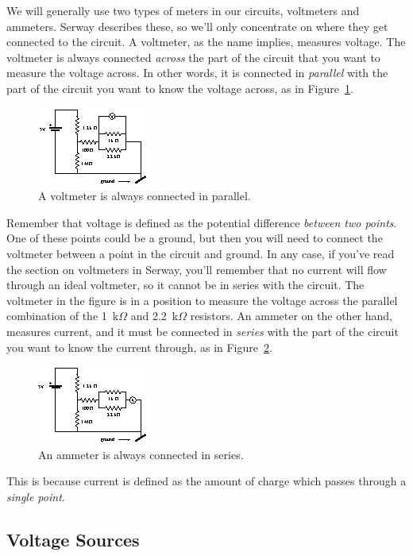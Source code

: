 \pagebreak
We will generally use two types of meters in our circuits, voltmeters and 
ammeters. Serway describes these, so we'll only concentrate on where they get 
connected to the circuit.  A voltmeter, as the name implies, measures voltage. 
The voltmeter is always connected {\it across} the part of the circuit that 
you want to measure the voltage across. In other words, it is connected in 
{\it parallel} with the part of the circuit you want to know the voltage 
across, as in Figure~\ref{fig:DC:voltmeter}.  
\begin{figure}[!htb]
\centering \epsfxsize=10cm \includegraphics[scale=6]{2_dc/voltmeter.eps}
\caption{A voltmeter is always connected in parallel.}
\label{fig:DC:voltmeter}
\end{figure}

Remember that voltage is defined as the potential difference {\it between 
two points}.  One of these points could be a ground, but then you will need to 
connect the voltmeter between a point in the circuit and ground.  In any case,
if you've read the section on voltmeters in Serway, you'll remember that no 
current will flow through an ideal voltmeter, so it cannot be in series with 
the circuit. The voltmeter in the figure is in a position to measure the 
voltage across the parallel combination of the 1~k$\Omega$ and 2.2~k$\Omega$ 
resistors. An ammeter on the other hand, measures current, and it must be 
connected in {\it series} with the part of the circuit you want to know the 
current through, as in Figure~\ref{fig:DC:ammeter}. 
\begin{figure}[!htb]
\centering \epsfxsize=10cm \includegraphics[scale=6]{2_dc/ammeter.eps}
\caption{An ammeter is always connected in series.}
\label{fig:DC:ammeter}
\end{figure}
This is because current is defined as the amount of charge which passes through
a {\it single point}.

\subsection{Voltage Sources}

